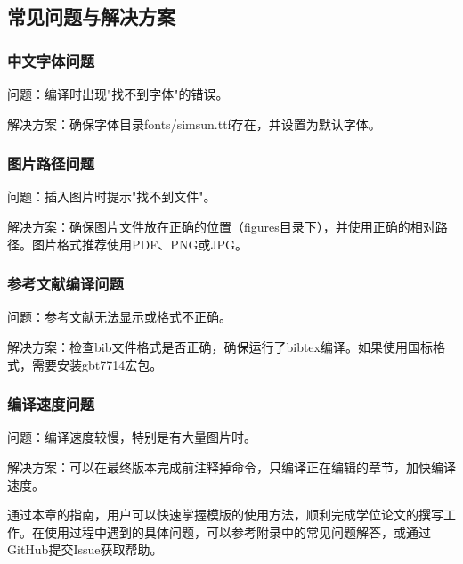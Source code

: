 \subsection{常见问题与解决方案}

\subsubsection{中文字体问题}
问题：编译时出现"找不到字体"的错误。

解决方案：确保字体目录fonts/simsun.ttf存在，并设置为默认字体。

\subsubsection{图片路径问题}
问题：插入图片时提示"找不到文件"。

解决方案：确保图片文件放在正确的位置（figures目录下），并使用正确的相对路径。图片格式推荐使用PDF、PNG或JPG。

\subsubsection{参考文献编译问题}
问题：参考文献无法显示或格式不正确。

解决方案：检查bib文件格式是否正确，确保运行了bibtex编译。如果使用国标格式，需要安装gbt7714宏包。

\subsubsection{编译速度问题}
问题：编译速度较慢，特别是有大量图片时。

解决方案：可以在最终版本完成前注释掉\verb||命令，只编译正在编辑的章节，加快编译速度。

通过本章的指南，用户可以快速掌握模版的使用方法，顺利完成学位论文的撰写工作。在使用过程中遇到的具体问题，可以参考附录中的常见问题解答，或通过GitHub提交Issue获取帮助。
